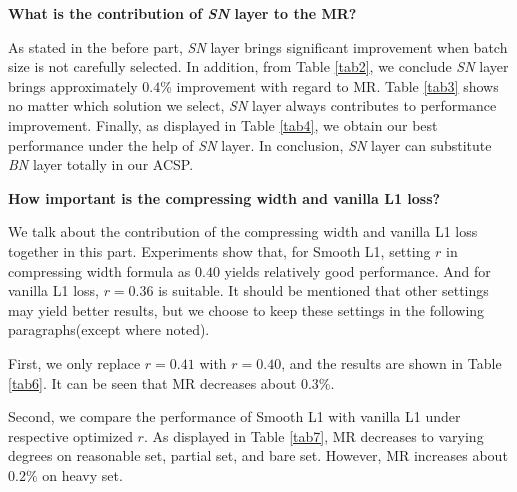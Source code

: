 \documentclass[twocolumn]{article}
\begin{document}
\textbf{What is the contribution of \textit{SN} layer to the MR?}\par
As stated in the before part, \textit{SN} layer brings significant improvement when batch size is not carefully selected. In addition, from Table \ref{tab2}, we conclude \textit{SN} layer brings approximately $0.4\%$ improvement with regard to MR. Table \ref{tab3} shows no matter which solution we select, \textit{SN} layer always contributes to performance improvement. Finally, as displayed in Table \ref{tab4}, we obtain our best performance under the help of  \textit{SN} layer. In conclusion, \textit{SN} layer can substitute \textit{BN} layer totally in our ACSP.

\textbf{How important is the compressing width and vanilla L1 loss?}\par 
We talk about the contribution of the compressing width and vanilla L1 loss together in this part. Experiments show that, for Smooth L1, setting $r$ in compressing width formula as $0.40$ yields relatively good performance. And for vanilla L1 loss, $r=0.36$ is suitable. It should be mentioned that other settings may yield better results, but we choose to keep these settings in the following paragraphs(except where noted).\par 
First, we only replace $r=0.41$ with $r=0.40$, and the results are shown in Table \ref{tab6}. It can be seen that MR decreases about $0.3\%$.\par 
Second, we compare the performance of Smooth L1 with vanilla L1 under respective optimized $r$. As displayed in Table \ref{tab7}, MR decreases to varying degrees on reasonable set, partial set, and bare set. However, MR increases about $0.2\%$ on heavy set. \par 
\end{document}
